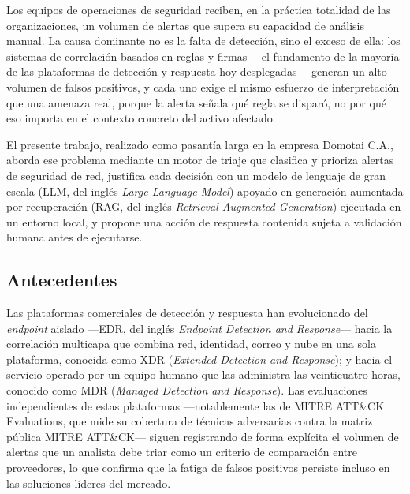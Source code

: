 %
%


Los equipos de operaciones de seguridad reciben, en la práctica totalidad de las organizaciones,
un volumen de alertas que supera su capacidad de análisis manual. La causa dominante no es la
falta de detección, sino el exceso de ella: los sistemas de correlación basados en reglas y
firmas ---el fundamento de la mayoría de las plataformas de detección y respuesta hoy
desplegadas--- generan un alto volumen de falsos positivos, y cada uno exige el mismo esfuerzo de
interpretación que una amenaza real, porque la alerta señala qué regla se disparó, no por qué eso
importa en el contexto concreto del activo afectado.

El presente trabajo, realizado como pasantía larga en la empresa Domotai C.A., aborda ese problema
mediante un motor de triaje que clasifica y prioriza alertas de seguridad de red, justifica cada
decisión con un modelo de lenguaje de gran escala (LLM, del inglés \emph{Large Language Model})
apoyado en generación aumentada por recuperación (RAG, del inglés \emph{Retrieval-Augmented
Generation}) ejecutada en un entorno local, y propone una acción de respuesta contenida sujeta a
validación humana antes de ejecutarse.

\subsection*{Antecedentes}

Las plataformas comerciales de detección y respuesta han evolucionado del \emph{endpoint} aislado
---EDR, del inglés \emph{Endpoint Detection and Response}--- hacia la correlación multicapa que
combina red, identidad, correo y nube en una sola plataforma, conocida como XDR (\emph{Extended
Detection and Response}); y hacia el servicio operado por un equipo humano que las administra las
veinticuatro horas, conocido como MDR (\emph{Managed Detection and Response}). Las evaluaciones
independientes de estas plataformas ---notablemente las de MITRE ATT\&CK Evaluations, que mide su
cobertura de técnicas adversarias contra la matriz pública MITRE ATT\&CK--- siguen registrando de
forma explícita el volumen de alertas que un analista debe triar como un criterio de comparación
entre proveedores, lo que confirma que la fatiga de falsos positivos persiste incluso en las
soluciones líderes del mercado.

